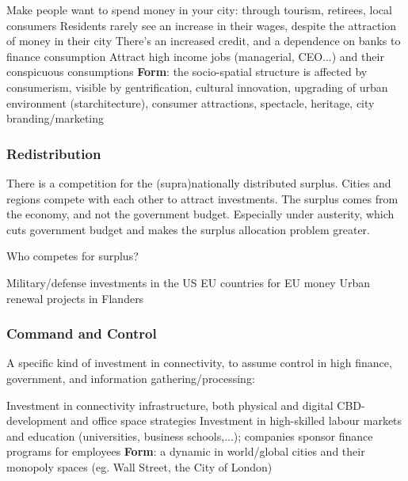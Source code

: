 \documentclass{article}
\begin{document}
\begin{outline}
	\1 Make people want to spend money in your city: through tourism, retirees, local consumers
	\1 Residents rarely see an increase in their wages, despite the attraction of money in their city
	\1 There's an increased credit, and a dependence on banks to finance consumption
	\1 Attract high income jobs (managerial, CEO...) and their conspicuous consumptions
	\1 \textbf{Form}: the socio-spatial structure is affected by consumerism, visible by gentrification, cultural innovation, upgrading of urban environment (starchitecture), consumer attractions, spectacle, heritage, city branding/marketing
\end{outline}

\subsubsection{Redistribution}

There is a competition for the (supra)nationally distributed surplus. Cities and regions compete with each other to attract investments. The surplus comes from the economy, and not the government budget. Especially under austerity, which cuts government budget and makes the surplus allocation problem greater.

Who competes for surplus?

\begin{outline}
	\1 Military/defense investments in the US
	\1 EU countries for EU money
	\1 Urban renewal projects in Flanders
\end{outline}

\subsubsection{Command and Control}

A specific kind of investment in connectivity, to assume control in high finance, government, and information gathering/processing:

\begin{outline}
	\1 Investment in connectivity infrastructure, both physical and digital
	\1 CBD-development and office space strategies
	\1 Investment in high-skilled labour markets and education (universities, business schools,...); companies sponsor finance programs for employees
	\1 \textbf{Form}: a dynamic in world/global cities and their monopoly spaces (eg. Wall Street, the City of London)
\end{outline}
\end{document}
